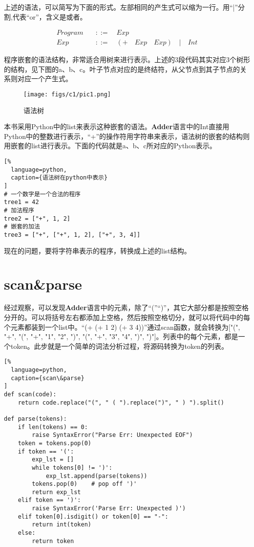 上述的语法，可以简写为下面的形式。左部相同的产生式可以缩为一行。用“|”分割,代表“or”，含义是或者。

\begin{equation}
\begin{aligned}
  \label{eq:2}
   Program \quad &::= \quad Exp \\
   Exp \quad &::= \quad (+ \quad Exp \quad Exp) \quad | \quad Int
\end{aligned}
\end{equation}

程序嵌套的语法结构，非常适合用树来进行表示。上述的3段代码其实对应3个树形的结构，见下图的a、b、c。叶子节点对应的是终结符，从父节点到其子节点的关系则对应一个产生式。

\begin{figure}[ht]
\centering
\texttt{[image: figs/c1/pic1.png]}
\caption{语法树}
\label{fig:fig1}
\end{figure}

本书采用Python中的list来表示这种嵌套的语法。\textbf{Adder}语言中的Int直接用Python中的整数进行表示，“+”的操作符用字符串来表示，语法树的嵌套的结构则用嵌套的list进行表示。下面的代码就是a、b、c所对应的Python表示。

\begin{lstlisting}[%
  language=python,
  caption={语法树在python中表示}
]
# 一个数字是一个合法的程序
tree1 = 42
# 加法程序
tree2 = ["+", 1, 2]
# 嵌套的加法
tree3 = ["+", ["+", 1, 2], ["+", 3, 4]]
\end{lstlisting}

现在的问题，要将字符串表示的程序，转换成上述的list结构。


\section{scan\&parse}

经过观察，可以发现\textbf{Adder}语言中的元素，除了“(”“)”，其它大部分都是按照空格分开的。可以将括号左右都添加上空格，然后按照空格切分，就可以将代码中的每个元素都装到一个list中。“(+ (+ 1 2) (+ 3 4))”通过scan函数，就会转换为["(", "+", "(", "+", "1", "2", ")", "(", "+", "3", "4", ")", ")"]。列表中的每个元素，都是一个token。此步就是一个简单的词法分析过程，将源码转换为token的列表。

\begin{lstlisting}[%
  language=python,
  caption={scan\&parse}
]
def scan(code):
    return code.replace("(", " ( ").replace(")", " ) ").split()

def parse(tokens):
    if len(tokens) == 0:
        raise SyntaxError("Parse Err: Unexpected EOF")
    token = tokens.pop(0)
    if token == '(':
        exp_lst = []
        while tokens[0] != ')':
            exp_lst.append(parse(tokens))
        tokens.pop(0)    # pop off ')'
        return exp_lst
    elif token == ')':
        raise SyntaxError('Parse Err: Unexpected )')
    elif token[0].isdigit() or token[0] == "-":
        return int(token)
    else:
        return token
\end{lstlisting}

